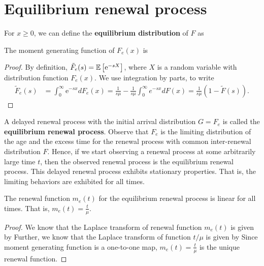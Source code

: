 \documentclass[a4paper,10pt,english]{article}
\begin{document}
\section{Equilibrium renewal process}
For $x \geq 0$, we can define the \textbf{equilibrium distribution} of $F$ as 
\begin{lem} The moment generating function of $F_e(x)$ is 
\end{lem}
\begin{proof}
By definition, $\tilde{F}_e(s) = \mathbb{E}\left[\mathrm{e}^{-sX}\right]$, where $ X $ is a random variable with distribution function $ F_e(x) $. 
We use integration by parts, to write 
\begin{align*}
 \tilde{F}_e(s) &= \int_{0}^{\infty}\mathrm{e}^{-sx}dF_e(x) = \frac{1}{s\mu}-\frac{1}{s \mu}\int_{0}^{\infty}e^{-sx}dF(x)
 = \frac{1}{s\mu}(1 - \tilde{F}(s)).
\end{align*}
 \end{proof}
A delayed renewal process with the initial arrival distribution $G=F_e$ is called the \textbf{equilibrium renewal process}. 
Observe that $F_e$ is the limiting distribution of the age and the excess time for the renewal process with common inter-renewal distribution $F$. 
Hence, if we start observing a renewal process at some arbitrarily large time $t$, 
then the observed renewal process is the equilibrium renewal process. 
This delayed renewal process exhibits stationary properties. 
That is, the limiting behaviors are exhibited for all times. 
\begin{thm}
The renewal function $m_e(t)$ for the equilibrium renewal process is linear for all times. 
That is, $m_e(t) =\frac{t}{\mu}$.
\end{thm}
\begin{proof}
We know that the Laplace transform of renewal function $m_e(t)$ is given by
Further, we know that the Laplace transform of function $t/\mu$ is given by 
Since moment generating function is a one-to-one map, $m_e(t) = \frac{t}{\mu}$ is the unique renewal function. 
\end{proof}
\end{document}

